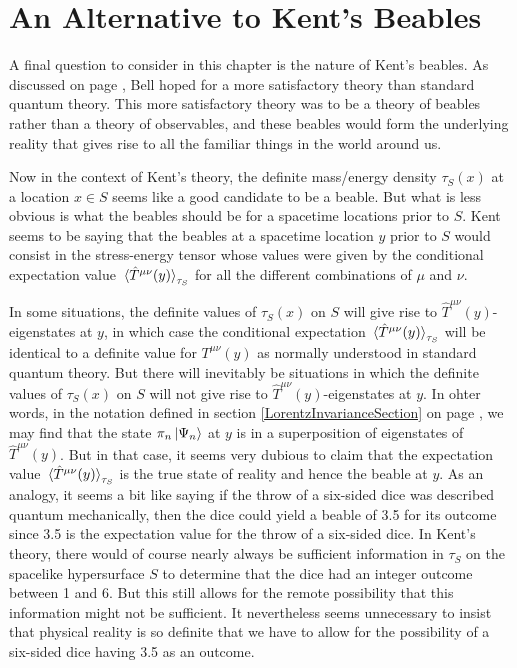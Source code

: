 \section{An Alternative to Kent's Beables}
A final question to consider in this chapter is the nature of Kent's beables. As discussed on page \pageref{beabledef}, Bell hoped for a more satisfactory theory than standard quantum theory. This more satisfactory theory was to be a theory of beables rather than a theory of observables, and these beables would form the underlying reality that gives rise to all the familiar things in the world around us. 

Now in the context of Kent's theory, the definite mass/energy density $\tau_S(x)$ at a location $x\in S$ seems like a good candidate to be a beable. But what is less obvious is what the beables should be for a spacetime locations prior to $S$. Kent seems to be saying that the beables at a spacetime location $y$ prior to $S$ would consist in the stress-energy tensor whose values were given by the conditional expectation value  $\ev*{\hat{T}^{\mu\nu}(y)}_{\tau_S}$ for all the different combinations of $\mu$ and $\nu$. 

In some situations, the definite values of $\tau_S(x)$ on $S$ will give rise to $\hat{T}^{\mu\nu}(y)$-eigenstates at $y$, in which case the conditional expectation $\ev*{\hat{T}^{\mu\nu}(y)}_{\tau_S}$ will be identical to a definite value for $T^{\mu\nu}(y)$ as normally understood in standard quantum theory. But there will inevitably be situations in which the definite values of $\tau_S(x)$ on $S$ will not give rise to  $\hat{T}^{\mu\nu}(y)$-eigenstates at $y$. In ohter words, in the notation defined in section \ref{LorentzInvarianceSection} on page \pageref{tauprojection}, we may find that the state $\pi_n\ket{\Psi_n}$ at $y$ is in a superposition of eigenstates of $\hat{T}^{\mu\nu}(y)$. But in that case, it seems very dubious to claim that the expectation value $\ev*{\hat{T}^{\mu\nu}(y)}_{\tau_S}$ is the true state of reality and hence the beable at $y$. As an analogy, it seems a bit like saying if the throw of a six-sided dice was described quantum mechanically, then the dice could yield a beable of 3.5 for its outcome since 3.5 is the expectation value for the throw of a six-sided dice. In Kent's theory, there would of course nearly always be sufficient information in $\tau_S$ on the spacelike hypersurface $S$  to determine that the dice had an integer outcome between 1 and 6. But this still allows for the remote possibility that this information might not be sufficient. It nevertheless seems unnecessary to insist that  physical reality is so definite that we have to allow for the possibility of a six-sided dice having 3.5 as an outcome. 

